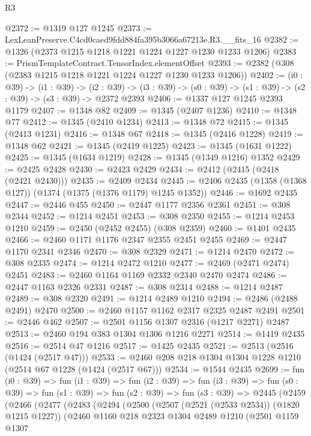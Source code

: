 \begin{lexlean}{R3}
\begin{coremodule}
@2372 := @1319 @127 @1245
@2373 := LexLeanPreserve.C4cd0caed9fdd884fa395b3066a67213e.R3.__fits_16
@2382 := @1326 (@2373 @1215 @1218 @1221 @1224 @1227 @1230 @1233 @1206)
@2383 := PrismTemplateContract.TensorIndex.elementOffset
@2393 := @2382 (@308 (@2383 @1215 @1218 @1221 @1224 @1227 @1230 @1233 @1206))
@2402 := (i0 : @39) ->
  (i1 : @39) ->
  (i2 : @39) -> (i3 : @39) -> (s0 : @39) -> (s1 : @39) -> (s2 : @39) -> (s3 : @39) -> @2372 @2393
@2406 := @1337 @127 @1245 @2393 @1179
@2407 := @1348 @82
@2409 := @1345 (@2407 @1236)
@2410 := @1348 @77
@2412 := @1345 (@2410 @1234)
@2413 := @1348 @72
@2415 := @1345 (@2413 @1231)
@2416 := @1348 @67
@2418 := @1345 (@2416 @1228)
@2419 := @1348 @62
@2421 := @1345 (@2419 @1225)
@2423 := @1345 (@1631 @1222)
@2425 := @1345 (@1634 @1219)
@2428 := @1345 (@1349 @1216) @1352
@2429 := @2425 @2428
@2430 := @2423 @2429
@2434 := @2412 (@2415 (@2418 (@2421 @2430)))
@2435 := @2409 @2434
@2445 := @2406 @2435 (@1358 (@1368 @127)) (@1374 (@1375 (@1376 @1179) @1245 @1352))
@2446 := @1692 @2435
@2447 := @2446 @455
@2450 := @2447 @1177 @2356 @2361
@2451 := @308 @2344
@2452 := @1214 @2451
@2453 := @308 @2350
@2455 := @1214 @2453 @1210
@2459 := @2450 (@2452 @2455) (@308 @2359)
@2460 := @1401 @2435
@2466 := @2460 @1171 @1176 @2347 @2355 @2451 @2455
@2469 := @2447 @1170 @2341 @2346
@2470 := @308 @2329
@2471 := @1214 @2470
@2472 := @308 @2335
@2474 := @1214 @2472 @1210
@2477 := @2469 (@2471 @2474) @2451
@2483 := @2460 @1164 @1169 @2332 @2340 @2470 @2474
@2486 := @2447 @1163 @2326 @2331
@2487 := @308 @2314
@2488 := @1214 @2487
@2489 := @308 @2320
@2491 := @1214 @2489 @1210
@2494 := @2486 (@2488 @2491) @2470
@2500 := @2460 @1157 @1162 @2317 @2325 @2487 @2491
@2501 := @2446 @462
@2507 := @2501 @1156 @1307 @2316 (@1217 @2271) @2487
@2513 := @2460 @194 @383 @1304 @1306 @1216 @2271
@2514 := @1419 @2435
@2516 := @2514 @47 @1216
@2517 := @1425 @2435
@2521 := @2513 (@2516 (@1424 (@2517 @47)))
@2533 := @2460 @208 @218 @1304 @1304 @1228 @1210 (@2514 @67 @1228 (@1424 (@2517 @67)))
@2534 := @1544 @2435
@2699 := fun (i0 : @39) =>
  fun (i1 : @39) =>
  fun (i2 : @39) =>
  fun (i3 : @39) =>
  fun (s0 : @39) =>
  fun (s1 : @39) =>
  fun (s2 : @39) =>
  fun (s3 : @39) =>
  @2445
    (@2459
      (@2466
        (@2477
          (@2483
            (@2494
              (@2500
                (@2507 (@2521 (@2533 @2534)) (@1820 @1215 @1227))
                (@2460
                  @1160
                  @218
                  @2323
                  @1304
                  @2489
                  @1210
                  (@2501
                    @1159
                    @1307

\end{coremodule}
\end{lexlean}
